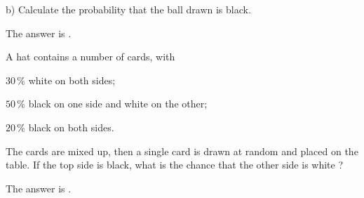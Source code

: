 \documentclass{ximera}
\begin{document}
\begin{question}
b) Calculate the probability that the ball drawn is black.
     \begin{solution}
           The answer is .
     \end{solution}
\end{question}

\begin{question}
A hat contains a number of cards, with

$30\,\%$ white on both sides;

$50\,\%$ black on one side and white on the other;

$20\,\%$ black on both sides.

The cards are mixed up, then a single card is drawn at random and placed on the table. If the top side is black, what is the chance that the other side is white ?
     \begin{solution}
           The answer is .
     \end{solution}
\end{question}
\end{document}
